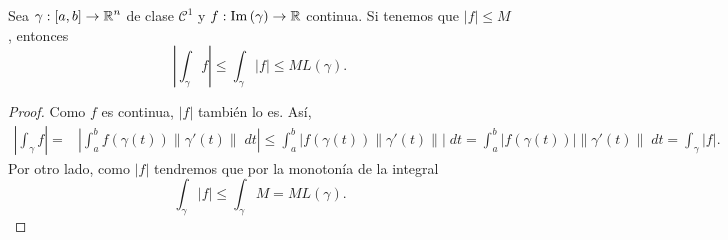 \begin{colorary}
	Sea $\displaystyle \gamma: \left[a,b\right] \to \mathbb{R}^{n} $ de clase $\displaystyle \mathcal{C}^{1} $ y $\displaystyle f : \operatorname{Im}\left(\gamma \right)\to \mathbb{R} $ continua. Si tenemos que $\displaystyle \left|f\right|\leq M $, entonces 
\[ \left|\int _{\gamma }f \right|\leq \int _{\gamma } \left|f\right| \leq ML\left(\gamma \right) .\]
\end{colorary}
\begin{proof}
Como $\displaystyle f $ es continua, $\displaystyle \left|f\right| $ también lo es. Así, 
\[
\begin{split}
	\left|\int _{\gamma }f \right|= & \left|\int^{b}_{a} f\left(\gamma\left(t\right)\right)\|\gamma'\left(t\right)\| \; dt\right| \leq \int^{b}_{a} \left|f\left(\gamma\left(t\right)\right)\|\gamma'\left(t\right)\|\right| \; dt = \int^{b}_{a} \left|f\left(\gamma\left(t\right)\right)\right|\|\gamma'\left(t\right)\| \; dt=\int _{\gamma } \left|f\right|.
\end{split}
\]
Por otro lado, como $\displaystyle \left|f\right| $ tendremos que por la monotonía de la integral
\[\int _{\gamma } \left|f\right| \leq \int _{\gamma }M = ML\left(\gamma \right) .\]
\end{proof}
